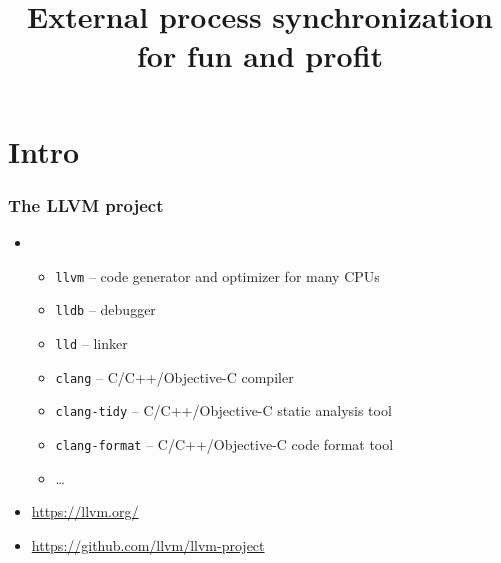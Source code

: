 \documentclass[compress,table,xcolor=table]{beamer}
\newcommand{\shelltext}[1]{\texttt{\colorbox{light-gray}{#1}}}
\begin{document}
\title{External process synchronization\\for fun and profit}
\section{Intro}
\frame{\titlepage}
\begin{frame}
  \frametitle{The LLVM project}
  \begin{itemize}
      \item{\LARGE{}}
        \begin{itemize}
          \item{\shelltext{llvm} -- code generator and optimizer for many CPUs}
          \item{\shelltext{lldb} -- debugger}
          \item{\shelltext{lld} -- linker}
          \item{\shelltext{clang} -- C/C++/Objective-C compiler}
          \item{\shelltext{clang-tidy} -- C/C++/Objective-C static analysis tool}
          \item{\shelltext{clang-format} -- C/C++/Objective-C code format tool}
          \item{\ldots}
        \end{itemize}
      \item{\url{https://llvm.org/}}
      \item{\url{https://github.com/llvm/llvm-project}}
  \end{itemize}
\end{frame}
\end{document}
